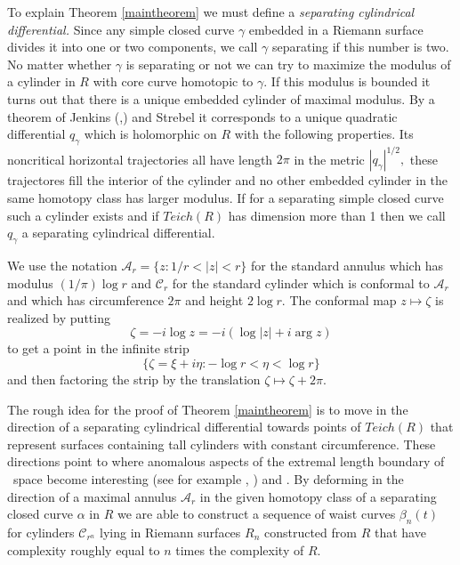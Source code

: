 \documentclass[12pt]{amsart}
\theoremstyle{remark}
\theoremstyle{definition}
\theoremstyle{definition}
\begin{document}
\begin{section}
To explain Theorem \ref{maintheorem} we must define a  {\it separating cylindrical differential.}   Since any simple closed curve $\gamma$ embedded in a Riemann surface divides it into one or two components, we call $\gamma$ separating if this number is two.  No matter whether $\gamma$ is separating or not we can try to maximize the modulus of a cylinder in $R$  with core curve  homotopic to 
$\gamma.$  If this modulus is bounded  it turns out that there is a unique embedded cylinder of maximal modulus. By a 
theorem of Jenkins  (\cite{Jenkins1},\cite{Jenkins2}) and Strebel  \cite{Strebelbook} it  corresponds to a unique  quadratic differential $q_{\gamma}$ which is holomorphic on $R$ with the following properties.  Its noncritical horizontal trajectories  all have length $2\pi$ in the metric $|q_{\gamma}|^{1/2},$  these trajectores fill the interior of the cylinder and no other embedded cylinder in the same homotopy class has larger modulus.   If for a separating simple closed curve such a cylinder exists and if $Teich(R)$ has dimension more than 1 then we call $q_{\gamma}$ a separating cylindrical differential.

We use the notation ${\mathcal A}_r=\{z: 1/r < |z| <r\}$ for the standard annulus which has modulus
$(1/\pi) \log r$ and ${\mathcal C}_r$ for the standard cylinder which is conformal to ${\mathcal A}_r$ and which has 
circumference $2\pi$ and height $2\log r.$  The conformal map $z \mapsto \zeta$ is realized by 
putting $$\zeta = - i\log z= - i(\log |z| + i \arg z)$$ to get a point in the infinite strip 
$$\{\zeta=\xi + i \eta: -\log r < \eta <\log r\}$$  and
then factoring the strip by the translation $\zeta \mapsto \zeta + 2 \pi.$

    

The rough idea for the proof of Theorem \ref{maintheorem} is to move in the direction of  a separating cylindrical differential towards points of $Teich(R)$ that represent surfaces containing tall cylinders with constant circumference.  These directions point to where anomalous aspects of the extremal length boundary of \te\ space become interesting (see for example \cite{LiuandSu}, \cite{Walsh1}) and \cite{Minsky4}.    
  By deforming in the direction of a maximal annulus ${\mathcal A}_r$ in the given homotopy class of a separating closed curve $\alpha$ in $R$  we are able to 
construct a  sequence of waist curves $\beta_n(t)$ for cylinders ${\mathcal C}_{r^n}$ lying in 
Riemann surfaces $R_n$  constructed from $R$  that have complexity roughly equal  to $n$ times the complexity of $R.$ 


\end{section}
\end{document}
